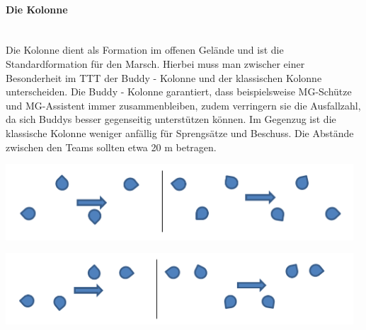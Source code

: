 \paragraph{Die Kolonne}$\ $\\
Die Kolonne dient als Formation im offenen Gelände und ist die Standardformation für den Marsch. Hierbei muss man zwischer einer Besonderheit im \ac{TTT} der Buddy - Kolonne und der klassischen Kolonne unterscheiden. Die Buddy - Kolonne garantiert, dass beispielsweise MG-Schütze und MG-Assistent immer zusammenbleiben, zudem verringern sie die Ausfallzahl, da sich Buddys besser gegenseitig unterstützen können. Im Gegenzug ist die klassische Kolonne weniger anfällig für Sprengsätze und Beschuss. Die Abstände zwischen den Teams sollten etwa 20 m betragen.\\
\begin{minipage}[t]{1\textwidth}
	\includegraphics[width=13cm]{./Grafiken/Abschnitt/Kolonne.png}
	\label{Kolonne}
\end{minipage}
\begin{minipage}[t]{1\textwidth}
	\includegraphics[width=13cm]{./Grafiken/Abschnitt/Buddykolonne.png}
\end{minipage}
